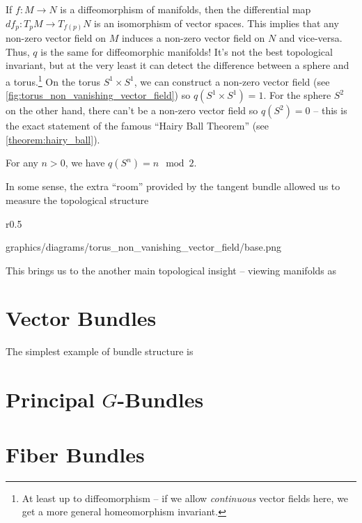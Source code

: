 If $f : M \to N$ is a diffeomorphism of manifolds, then the differential map $df_p : T_p M \to T_{f(p)} N$ is an isomorphism of vector spaces. This implies that any non-zero vector field on $M$ induces a non-zero vector field on $N$ and vice-versa. Thus, $q$ is the same for diffeomorphic manifolds!
It's not the best topological invariant, but at the very least it can detect the difference between a sphere and a torus.\footnote{At least up to diffeomorphism -- if we allow \emph{continuous} vector fields here, we get a more general homeomorphism invariant.} 
On the torus $S^1\times S^1$, we can construct a non-zero vector field (see \cref{fig:torus_non_vanishing_vector_field}) so $q(S^1\times S^1)=1$. For the sphere $S^2$ on the other hand, there can't be a non-zero vector field so $q(S^2)=0$ -- this is the exact statement of the famous ``Hairy Ball Theorem'' (see \cref{theorem:hairy_ball}).

\begin{theorem}\label{theorem:hairy_ball}
  For any $n>0$, we have $q(S^n) = n\mod 2$. 
\end{theorem}

In some sense, the extra ``room'' provided by the tangent bundle allowed us to measure the topological structure 


\begin{wrapfigure}{r}{0.5\textwidth}
	\centering
	\begin{lkx_diagram}{graphics/diagrams/torus_non_vanishing_vector_field/base.png}
	\end{lkx_diagram}
	\caption{A non-zero vector field on a torus.}\label{fig:torus_non_vanishing_vector_field}
\end{wrapfigure}

\vspace{1em}


%
This brings us to the another main topological insight -- viewing manifolds as 
%

{\color{red}\lipsum[1-2]}

\section{Vector Bundles}

The simplest example of bundle structure is 

\section{Principal $G$-Bundles}

\section{Fiber Bundles}
